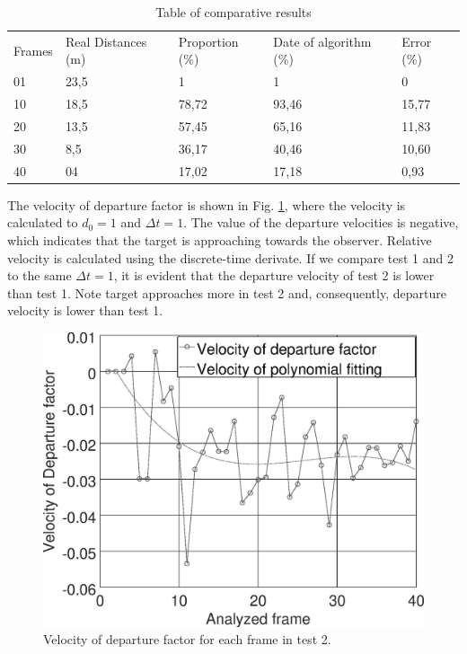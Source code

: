 \begin{table}[H]
\setlength{\tabcolsep}{1 pt} 
\caption{Table of comparative results}
\begin{tabular}{lllll}
Frames & Real Distances (m) & Proportion (\%) & Date of algorithm (\%) & Error (\%)\\
01 & 23,5 & 1 & 1 & 0 \\
10 & 18,5 & 78,72 & 93,46 & 15,77 \\
20 & 13,5 & 57,45 & 65,16 & 11,83 \\
30 & 8,5 & 36,17 & 40,46 & 10,60 \\
40 & 04 & 17,02 & 17,18 & 0,93
\end{tabular}
\end{table}

The velocity of departure factor is shown in 
Fig. \ref{fig:res_grapha_bv}, where the velocity is calculated
to $d_0=1$ and $\Delta t=1$. The value of the departure
velocities is negative, which indicates that the
target is approaching towards the observer. Relative velocity is calculated 
using the discrete-time derivate.
If we compare test 1 and 2 to the same $\Delta t=1$, it is evident 
that the departure velocity of  test 2  is lower than test 1. 
Note target approaches more in test 2 and, consequently, departure
velocity is lower than test 1.
\begin{figure}[!hbt]
\includegraphics[width=\columnwidth]{images/graphvelocity.eps}
\caption{Velocity of departure factor for each frame in test 2.}
\label{fig:res_grapha_bv}
\end{figure}


